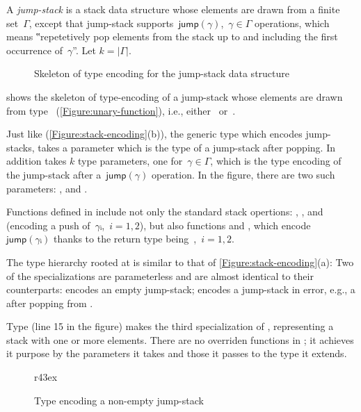 A \emph{jump-stack} is a stack data structure whose elements are drawn from a finite set~$Γ$,
  except that jump-stack supports~$\textsf{jump}(γ)$,~$γ∈Γ$ operations,
    which means
  ‟repetetively pop elements from the stack up to and including the first occurrence of~$γ$”.
Let $k=|\Gamma|$. 

\begin{wrapfigure}[16]{r}{42ex}
  \caption{Skeleton of type encoding for the jump-stack data structure}%
  \label{Figure:jump}%
  \lstset{style=numbered}
\end{wrapfigure}

 shows the skeleton of type-encoding of a jump-stack whose
elements are drawn from type~
(\cref{Figure:unary-function}), i.e., either~ or~.

Just like  (\cref{Figure:stack-encoding}(b)),
  the generic type  which encodes jump-stacks, takes
  a  parameter which is the type of a jump-stack after popping.
In addition  takes $k$ type parameters, one for~$γ∈Γ$,
  which is the type encoding of the jump-stack after a~$\textsf{jump}(γ)$
  operation.
In the figure, there are two such parameters: , and
  .

Functions defined in  include not only the standard stack opertions: ,
,  and~ (encoding a push of~$γᵢ$,~$i=1,2$),
  but also functions  and ,
  which encode~$\textsf{jump}(γᵢ)$
  thanks to the return type being~,~$i=1,2$.

The type hierarchy rooted at  is similar to that of
\cref{Figure:stack-encoding}(a):
  Two of the specializations are parameterless and are
  almost identical to their 
  counterparts:
 encodes an empty jump-stack;  encodes a jump-stack in error,
e.g., a after popping from .


Type  (line 15 in the figure) makes  the third specialization of , representing 
  a stack with one or more elements.
There are no overriden functions in ; it achieves
  it purpose by the parameters it takes and those it passes
  to the type it extends.

\begin{wrapfigure}[10]r{43ex}
  \caption{\label{Figure:jump-stack-push} Type  encoding a non-empty jump-stack}
\end{wrapfigure}

